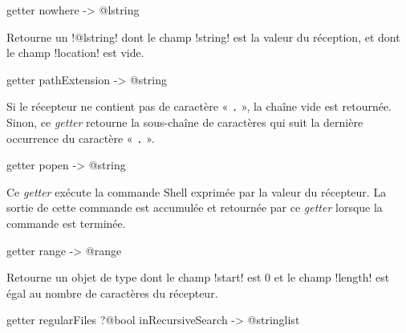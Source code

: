 
\begin{galgasbox}
getter nowhere -> @lstring
\end{galgasbox}

Retourne un \ggs!@lstring! dont le champ \ggs!string! est la valeur du réception, et dont le champ \ggs!location! est vide.








\begin{galgasbox}
getter pathExtension -> @string
\end{galgasbox}

Si le récepteur ne contient pas de caractère « \texttt{.} », la chaîne vide est retournée. Sinon, ce \emph{getter} retourne la sous-chaîne de caractères qui suit la dernière occurrence du caractère « \texttt{.} ».









\begin{galgasbox}
getter popen -> @string
\end{galgasbox}

Ce \emph{getter} exécute la commande Shell exprimée par la valeur du récepteur. La sortie de cette commande est accumulée et retournée par ce \emph{getter} lorsque la commande est terminée.









\begin{galgasbox}
getter range -> @range
\end{galgasbox}

Retourne un objet de type  dont le champ \ggs!start! est $0$ et le champ \ggs!length! est égal au nombre de caractères du récepteur.









\begin{galgasbox}
getter regularFiles ?@bool inRecursiveSearch -> @stringlist
\end{galgasbox}

